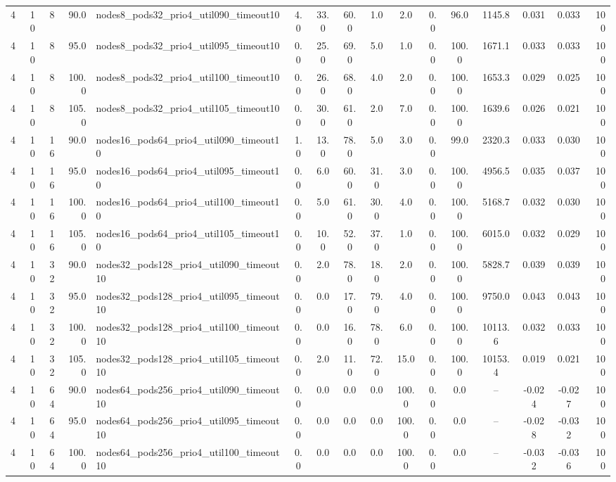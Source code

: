 \begin{tabular}{r r r r l c c c c c c c c c c r}
4 & 10 & 8 & 90.0 & nodes8\_pods32\_prio4\_util090\_timeout10 & 4.0 & 33.0 & 60.0 & 1.0 & 2.0 & 0.0 & 96.0 & 1145.8 & 0.031 & 0.033 & 100 \\
4 & 10 & 8 & 95.0 & nodes8\_pods32\_prio4\_util095\_timeout10 & 0.0 & 25.0 & 69.0 & 5.0 & 1.0 & 0.0 & 100.0 & 1671.1 & 0.033 & 0.033 & 100 \\
4 & 10 & 8 & 100.0 & nodes8\_pods32\_prio4\_util100\_timeout10 & 0.0 & 26.0 & 68.0 & 4.0 & 2.0 & 0.0 & 100.0 & 1653.3 & 0.029 & 0.025 & 100 \\
4 & 10 & 8 & 105.0 & nodes8\_pods32\_prio4\_util105\_timeout10 & 0.0 & 30.0 & 61.0 & 2.0 & 7.0 & 0.0 & 100.0 & 1639.6 & 0.026 & 0.021 & 100 \\
4 & 10 & 16 & 90.0 & nodes16\_pods64\_prio4\_util090\_timeout10 & 1.0 & 13.0 & 78.0 & 5.0 & 3.0 & 0.0 & 99.0 & 2320.3 & 0.033 & 0.030 & 100 \\
4 & 10 & 16 & 95.0 & nodes16\_pods64\_prio4\_util095\_timeout10 & 0.0 & 6.0 & 60.0 & 31.0 & 3.0 & 0.0 & 100.0 & 4956.5 & 0.035 & 0.037 & 100 \\
4 & 10 & 16 & 100.0 & nodes16\_pods64\_prio4\_util100\_timeout10 & 0.0 & 5.0 & 61.0 & 30.0 & 4.0 & 0.0 & 100.0 & 5168.7 & 0.032 & 0.030 & 100 \\
4 & 10 & 16 & 105.0 & nodes16\_pods64\_prio4\_util105\_timeout10 & 0.0 & 10.0 & 52.0 & 37.0 & 1.0 & 0.0 & 100.0 & 6015.0 & 0.032 & 0.029 & 100 \\
4 & 10 & 32 & 90.0 & nodes32\_pods128\_prio4\_util090\_timeout10 & 0.0 & 2.0 & 78.0 & 18.0 & 2.0 & 0.0 & 100.0 & 5828.7 & 0.039 & 0.039 & 100 \\
4 & 10 & 32 & 95.0 & nodes32\_pods128\_prio4\_util095\_timeout10 & 0.0 & 0.0 & 17.0 & 79.0 & 4.0 & 0.0 & 100.0 & 9750.0 & 0.043 & 0.043 & 100 \\
4 & 10 & 32 & 100.0 & nodes32\_pods128\_prio4\_util100\_timeout10 & 0.0 & 0.0 & 16.0 & 78.0 & 6.0 & 0.0 & 100.0 & 10113.6 & 0.032 & 0.033 & 100 \\
4 & 10 & 32 & 105.0 & nodes32\_pods128\_prio4\_util105\_timeout10 & 0.0 & 2.0 & 11.0 & 72.0 & 15.0 & 0.0 & 100.0 & 10153.4 & 0.019 & 0.021 & 100 \\
4 & 10 & 64 & 90.0 & nodes64\_pods256\_prio4\_util090\_timeout10 & 0.0 & 0.0 & 0.0 & 0.0 & 100.0 & 0.0 & 0.0 & -- & -0.024 & -0.027 & 100 \\
4 & 10 & 64 & 95.0 & nodes64\_pods256\_prio4\_util095\_timeout10 & 0.0 & 0.0 & 0.0 & 0.0 & 100.0 & 0.0 & 0.0 & -- & -0.028 & -0.032 & 100 \\
4 & 10 & 64 & 100.0 & nodes64\_pods256\_prio4\_util100\_timeout10 & 0.0 & 0.0 & 0.0 & 0.0 & 100.0 & 0.0 & 0.0 & -- & -0.032 & -0.036 & 100 \\

\end{tabular}

